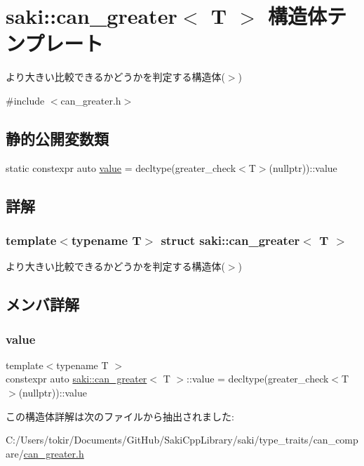 \hypertarget{structsaki_1_1can__greater}{}\section{saki\+:\+:can\+\_\+greater$<$ T $>$ 構造体テンプレート}
\label{structsaki_1_1can__greater}


より大きい比較できるかどうかを判定する構造体($>$)  




{\ttfamily \#include $<$can\+\_\+greater.\+h$>$}

\subsection*{静的公開変数類}
\begin{DoxyCompactItemize}
\item 
static constexpr auto \mbox{\hyperlink{structsaki_1_1can__greater_a75ef553abd1f49c63f4d31fed7f1f51f}{value}} = decltype(greater\+\_\+check$<$T$>$(nullptr))\+::value
\end{DoxyCompactItemize}


\subsection{詳解}
\subsubsection*{template$<$typename T$>$\newline
struct saki\+::can\+\_\+greater$<$ T $>$}

より大きい比較できるかどうかを判定する構造体($>$) 

\subsection{メンバ詳解}
\mbox{\label{structsaki_1_1can__greater_a75ef553abd1f49c63f4d31fed7f1f51f}} 
\subsubsection{\texorpdfstring{value}{value}}
{\footnotesize\ttfamily template$<$typename T $>$ \\
constexpr auto \mbox{\hyperlink{structsaki_1_1can__greater}{saki\+::can\+\_\+greater}}$<$ T $>$\+::value = decltype(greater\+\_\+check$<$T$>$(nullptr))\+::value\hspace{0.3cm}{\ttfamily [static]}}



この構造体詳解は次のファイルから抽出されました\+:\begin{DoxyCompactItemize}
\item 
C\+:/\+Users/tokir/\+Documents/\+Git\+Hub/\+Saki\+Cpp\+Library/saki/type\+\_\+traits/can\+\_\+compare/\mbox{\hyperlink{can__greater_8h}{can\+\_\+greater.\+h}}\end{DoxyCompactItemize}

